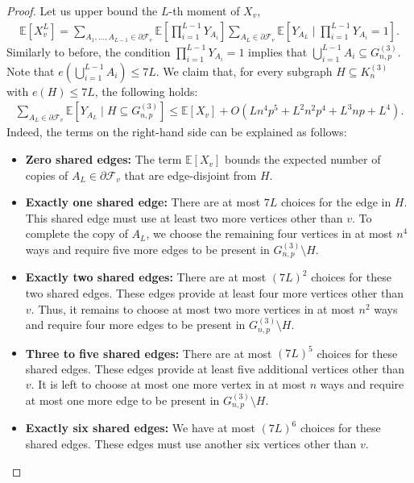 \documentclass[11pt,a4paper,oneside,reqno]{amsart}
\newcommand{\Gnp}{G_{n, p}^{(3)}}
\newcommand{\cF}{\mathcal{F}}
\newcommand{\1}{\mathbbm{1}} %
\renewcommand{\le}{\leqslant}
\begin{document}
\begin{proof}
    Let us upper bound the $L$-th moment of $X_v$,
    \begin{align*}
        \mathbb{E}\left[X_v^L\right] = \sum_{A_1, \dots, A_{L-1} \in \partial \cF_v} \mathbb{E}\left[\prod_{i=1}^{L-1} Y_{A_i}\right] \sum_{A_L \in \partial \cF_v} \mathbb{E}\left[Y_{A_L} \mid \prod_{i=1}^{L-1} Y_{A_i} = 1\right].
    \end{align*}
    Similarly to before, the condition $\prod_{i=1}^{L-1} Y_{A_i} = 1$ implies that $\bigcup_{i=1}^{L-1} A_i \subseteq \Gnp$. Note that $e\left( \bigcup_{i=1}^{L-1} A_i \right) \le 7L$. We claim that, for every subgraph $H \subseteq K_n^{(3)}$ with $e(H) \le 7L$, the following holds:
    \begin{align*}
        \sum_{A_L \in \partial \cF_v} \mathbb{E}\left[Y_{A_L} \mid H \subseteq \Gnp\right] \le \mathbb{E}\left[X_v\right] + O\left(L n^4 p^5 + L^2 n^2 p^4 + L^3 n p + L^4\right). 
    \end{align*}
    Indeed, the terms on the right-hand side can be explained as follows:
    \begin{itemize}
        \item \textbf{Zero shared edges:} The term $\mathbb{E}\left[X_v\right]$ bounds the expected number of copies of $A_L \in \partial \cF_v$ that are edge-disjoint from $H$.
        \item \textbf{Exactly one shared edge:} There are at most $7L$ choices for the edge in $H$. This shared edge must use at least two more vertices other than $v$. To complete the copy of $A_L$, we choose the remaining four vertices in at most $n^4$ ways and require five more edges to be present in $\Gnp \setminus H$.
        \item \textbf{Exactly two shared edges:} There are at most $(7L)^2$ choices for these two shared edges. These edges provide at least four more vertices other than $v$. Thus, it remains to choose at most two more vertices in at most $n^2$ ways and require four more edges to be present in $\Gnp \setminus H$.
        \item \textbf{Three to five shared edges:} There are at most $(7L)^5$ choices for these shared edges. These edges provide at least five additional vertices other than $v$. It is left to choose at most one more vertex in at most $n$ ways and require at most one more edge to be present in $\Gnp \setminus H$.
        \item \textbf{Exactly six shared edges:} We have at most $(7L)^6$ choices for these shared edges. These edges must use another six vertices other than $v$.

\end{itemize}
\end{proof}
\end{document}

